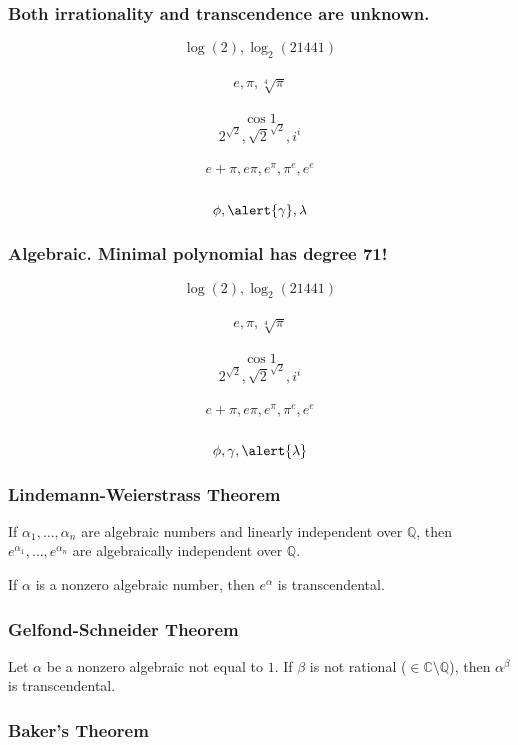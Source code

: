 \documentclass{beamer}
\begin{document}
\begin{frame}
	\frametitle{Both irrationality and transcendence are unknown.}
	
    \[\log(2), \log_{2}(21441)\] \\ \[e, \pi, \sqrt[4]{\pi}\] \\ \[\cos{1}\] \[2^{\sqrt{2}}, {\sqrt{2}}^{\sqrt{2}}, {i}^{i}\] \\ \[e + \pi, e\pi, e^{\pi}, {\pi}^{e}, {e}^{e}\] \\ \[\phi, \alert{\gamma}, \lambda\]
	
\end{frame}

\begin{frame}
	\frametitle{Algebraic. Minimal polynomial has degree 71!}
	
    \[\log(2), \log_{2}(21441)\] \\ \[e, \pi, \sqrt[4]{\pi}\] \\ \[\cos{1}\] \[2^{\sqrt{2}}, {\sqrt{2}}^{\sqrt{2}}, {i}^{i}\] \\ \[e + \pi, e\pi, e^{\pi}, {\pi}^{e}, {e}^{e}\] \\ \[\phi, \gamma, \alert{\lambda}\]
	
\end{frame}

\begin{frame}
    \frametitle{Lindemann-Weierstrass Theorem}
    \begin{theorem}
        If $\alpha_1, \ldots, \alpha_n$ are algebraic numbers and linearly independent over $\mathbb{Q}$, then $e^{\alpha_1}, \ldots, e^{\alpha_n}$ are algebraically independent over $\mathbb{Q}$.
    \end{theorem}
    \begin{corollary}
        If $\alpha$ is a nonzero algebraic number, then $e^{\alpha}$ is transcendental.
    \end{corollary}
\end{frame}

\begin{frame}
    \frametitle{Gelfond-Schneider Theorem}
    \begin{theorem}
        Let $\alpha$ be a nonzero algebraic not equal to $1$. If $\beta$ is not rational ($\in \mathbb{C} \setminus \mathbb{Q}$), then $\alpha^{\beta}$ is transcendental.
    \end{theorem}
\end{frame}

\begin{frame}
    \frametitle{Baker's Theorem}
    \begin{theorem}
        
    \end{theorem}
\end{frame}
\end{document}
